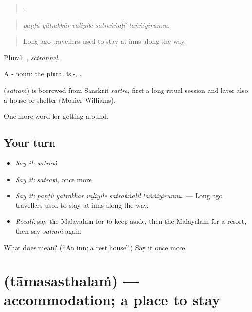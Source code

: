 \begin{quote}
    .
\end{quote}

\begin{quote}
\emph{paṇṭŭ yātrakkār vaḻiyile satraṅṅaḷil taṅṅiyirunnu.}
\end{quote}

\begin{quote}
Long ago travellers used to stay at inns along the way.
\end{quote}

Plural: , \emph{satraṅṅaḷ}.

A - noun: the plural is -, .

\begin{cousinweb}
\textbf{} (\emph{satraṁ}) is borrowed from Sanskrit \emph{sattra}, first a long ritual session and later also a house or shelter (Monier-Williams).
\end{cousinweb}

\begin{grammarlens}[title={What you've built}]
One more word for getting around.
\end{grammarlens}

\subsection*{Your turn}
\begin{itemize}
\raggedright
  \item \emph{Say it:} \emph{satraṁ}
  \item \emph{Say it:} \emph{satraṁ}, once more
  \item \emph{Say it:} \emph{paṇṭŭ yātrakkār vaḻiyile satraṅṅaḷil taṅṅiyirunnu.} — Long ago travellers used to stay at inns along the way.
  \item \emph{Recall:} say the Malayalam for to keep aside, then the Malayalam for a resort, then say \emph{satraṁ} again
\end{itemize}

\begin{tcolorbox}[breakable,colback=teal!4,colframe=teal!35!black,title={Before you move on}]
What does  mean? (\textquotedblleft{}An inn; a rest house\textquotedblright{}.) Say it once more.
\end{tcolorbox}
\section[\texorpdfstring{\ml{താമസസ്ഥലം} (tāmasasthalaṁ)}{താമസസ്ഥലം (tāmasasthalaṁ)}]{ (tāmasasthalaṁ) — accommodation; a place to stay}

